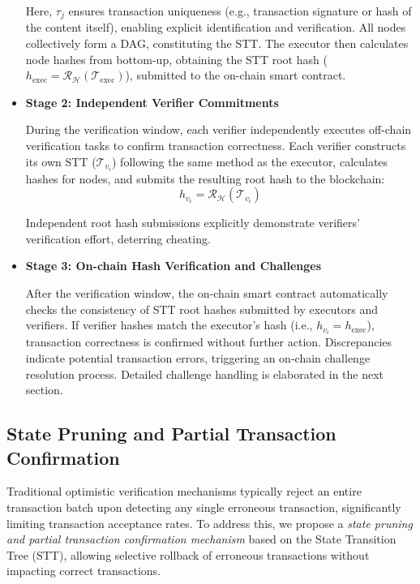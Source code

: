 \documentclass[runningheads]{llncs}
\begin{document}
\begin{CJK*}{UTF8}{gbsn}
\begin{itemize}
    Here, $\tau_j$ ensures transaction uniqueness (e.g., transaction signature or hash of the content itself), enabling explicit identification and verification. All nodes collectively form a DAG, constituting the STT. The executor then calculates node hashes from bottom-up, obtaining the STT root hash ($h_{\text{exec}} = \mathcal{R_H}(\mathcal{T}_{\text{exec}})$), submitted to the on-chain smart contract.

    \item \textbf{Stage 2: Independent Verifier Commitments}  

    During the verification window, each verifier independently executes off-chain verification tasks to confirm transaction correctness. Each verifier constructs its own STT ($\mathcal{T}_{v_i}$) following the same method as the executor, calculates hashes for nodes, and submits the resulting root hash to the blockchain:
    \[
    h_{v_i} = \mathcal{R_H}(\mathcal{T}_{v_i})
    \]

    Independent root hash submissions explicitly demonstrate verifiers' verification effort, deterring cheating.

    \item \textbf{Stage 3: On-chain Hash Verification and Challenges}  

    After the verification window, the on-chain smart contract automatically checks the consistency of STT root hashes submitted by executors and verifiers. If verifier hashes match the executor’s hash (i.e., $h_{v_i} = h_{\text{exec}}$), transaction correctness is confirmed without further action. Discrepancies indicate potential transaction errors, triggering an on-chain challenge resolution process. Detailed challenge handling is elaborated in the next section.
\end{itemize}



\subsection{State Pruning and Partial Transaction Confirmation}

Traditional optimistic verification mechanisms typically reject an entire transaction batch upon detecting any single erroneous transaction, significantly limiting transaction acceptance rates. To address this, we propose a \textit{state pruning and partial transaction confirmation mechanism} based on the State Transition Tree (STT), allowing selective rollback of erroneous transactions without impacting correct transactions.


\end{CJK*}
\end{document}
